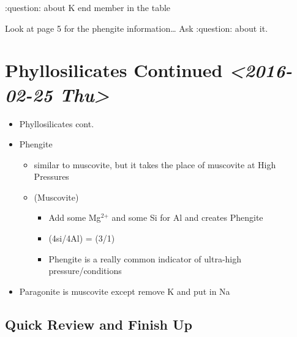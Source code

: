 \documentclass[11pt]{article}
\begin{document}
:question: about K end member in the table


Look at page 5 for the phengite information\ldots{} Ask :question: about it.

\section{Phyllosilicates Continued \textit{<2016-02-25 Thu>}}
\label{sec-4}
\begin{itemize}
\item Phyllosilicates cont.
\item Phengite
\begin{itemize}
\item similar to muscovite, but it takes the place of muscovite at High Pressures
\item {} (Muscovite)
\begin{itemize}
\item Add some Mg$^{\text{2+}}$ and some Si for Al and creates Phengite
\item (4si/4Al) = (3/1)
\item Phengite is a really common indicator of ultra-high pressure/conditions
\end{itemize}
\end{itemize}
\item Paragonite is muscovite except remove K and put in Na
\end{itemize}
\subsection{Quick Review and Finish Up}
\label{sec-4-1}
\end{document}
